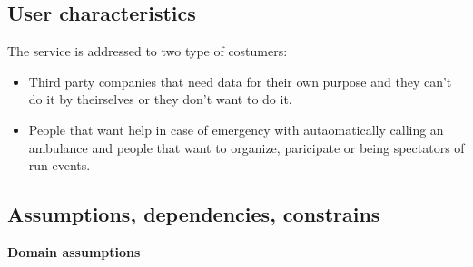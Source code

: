 \documentclass[../main.tex]{subfiles}
\begin{document}
\subsection{User characteristics}
The service is addressed to two type of costumers:
\begin{itemize}
	\item Third party companies that need data for their own purpose and they can't do it by theirselves or they don't want to do it.
	\item People that want help in case of emergency with autaomatically calling an ambulance and people that want to organize, paricipate or being spectators of run events.	
\end{itemize}

\subsection{Assumptions, dependencies, constrains}

{\bf Domain assumptions}
\end{document}
